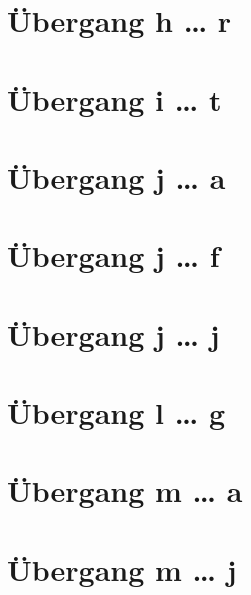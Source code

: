\documentclass[a4paper,landscape]{article}
\begin{document}
\hspace*{-1ex}
\newpage

\section{Übergang h … r }

\hspace*{-1ex}
\newpage

\section{Übergang i … t }

\hspace*{-1ex}
\newpage

\section{Übergang j … a }

\hspace*{-1ex}
\newpage

\section{Übergang j … f }

\hspace*{-1ex}
\newpage

\section{Übergang j … j }

\hspace*{-1ex}
\newpage

\section{Übergang l … g }

\hspace*{-1ex}
\newpage

\section{Übergang m … a }

\hspace*{-1ex}
\newpage

\section{Übergang m … j }
\end{document}

